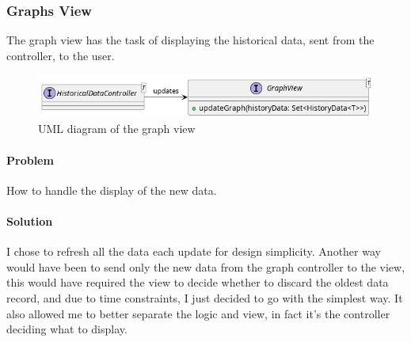 \subsubsection{Graphs View}

The graph view has the task of displaying the historical data, sent from the controller, to the user.

\begin{figure}[H]
\centering{}
\includegraphics[width=\textwidth,height=\textheight,keepaspectratio]{magnani/uml/graph-view.png}
\caption{UML diagram of the graph view}
\label{magnani:uml:graph-view}
\end{figure}

\paragraph{Problem} How to handle the display of the new data.
\paragraph{Solution} I chose to refresh all the data each update for design simplicity.
Another way would have been to send only the new data from the graph controller to the view,
this would have required the view to decide whether to discard the oldest data record,
and due to time constraints, I just decided to go with the simplest way.
It also allowed me to better separate the logic and view, in fact it's the controller
deciding what to display.
